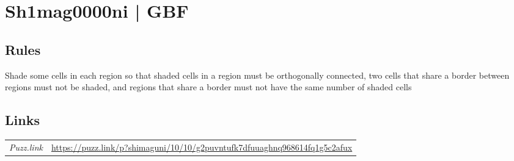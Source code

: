 \section[Sh1mag0000ni | GBF {[\emph{Shimaguni/Islands}]}]{Sh1mag0000ni | {\normalfont GBF}}
\label{sec:49-sh1mag0000ni-gbf}

\subsection*{Rules}
\begin{markdown}
Shade some cells in each region so that shaded cells in a region must be orthogonally connected, two cells that share a border between regions must not be shaded, and regions that share a border must not have the same number of shaded cells
\end{markdown}
\subsection*{Links}
\begin{tabularx}{\textwidth}{l X}
\emph{Puzz.link} & \url{https://puzz.link/p?shimaguni/10/10/g2puvntufk7dfuuaghnq968614fq1g5c2afux} \\
\end{tabularx}
\pagebreak
